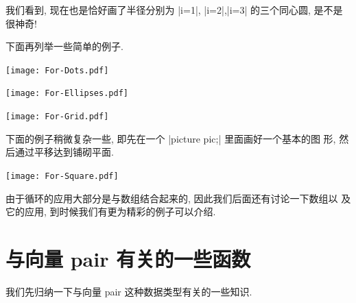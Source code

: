 \documentclass[nofonts,CJKnormalspaces]{ctexbook}[2009/05/20]
\begin{document}
我们看到, 现在也是恰好画了半径分别为 |i=1|, |i=2|,|i=3| 的三个同心圆,
是不是很神奇!

下面再列举一些简单的例子.
\begin{center}\texttt{[image: For-Dots.pdf]}\end{center}%


\begin{center}\texttt{[image: For-Ellipses.pdf]}\end{center}%


\begin{center}\texttt{[image: For-Grid.pdf]}\end{center}%


下面的例子稍微复杂一些, 即先在一个 |picture pic;| 里面画好一个基本的图
形, 然后通过平移达到铺砌平面.
\begin{center}\texttt{[image: For-Square.pdf]}\end{center}%


由于循环的应用大部分是与数组结合起来的, 因此我们后面还有讨论一下数组以
及它的应用, 到时候我们有更为精彩的例子可以介绍.

\section{与向量 pair  有关的一些函数}
我们先归纳一下与向量 pair 这种数据类型有关的一些知识.
\end{document}
